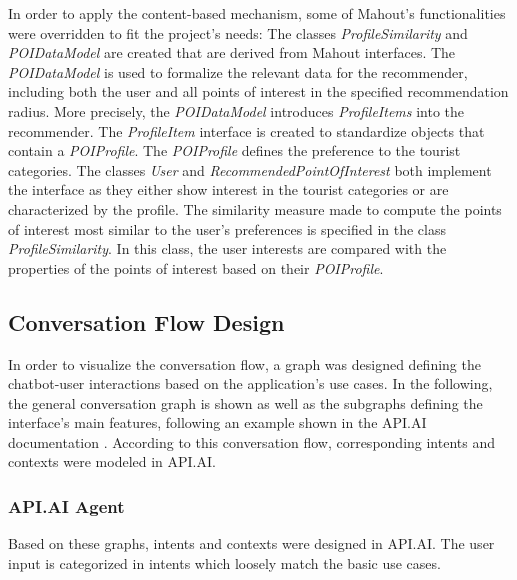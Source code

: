 In order to apply the content-based mechanism, some of Mahout’s functionalities were overridden to fit the project’s needs: The classes \textit{ProfileSimilarity} and \textit{POIDataModel} are created that are derived from Mahout interfaces. The \textit{POIDataModel} is used to formalize the relevant data for the recommender, including both the user and all points of interest in the specified recommendation radius. More precisely, the \textit{POIDataModel} introduces \textit{ProfileItems} into the recommender. The \textit{ProfileItem} interface is created to standardize objects that contain a \textit{POIProfile}. The \textit{POIProfile} defines the preference to the tourist categories. The classes \textit{User} and \textit{RecommendedPointOfInterest} both implement the interface as they either show interest in the tourist categories or are characterized by the profile. 
The similarity measure made to compute the points of interest most similar to the user’s preferences is specified in the class \textit{ProfileSimilarity}. In this class, the user interests are compared with the properties of the points of interest based on their \textit{POIProfile}.

\subsection{Conversation Flow Design}
In order to visualize the conversation flow, a graph was designed defining the chatbot-user interactions based on the application’s use cases. In the following, the general conversation graph is shown as well as the subgraphs defining the interface’s main features, following an example shown in the API.AI documentation \cite{apiai:conversationflow}. According to this conversation flow, corresponding intents and contexts were modeled in API.AI.






\subsubsection{API.AI Agent}
Based on these graphs, intents and contexts were designed in API.AI. The user input is categorized in intents which loosely match the basic use cases.

